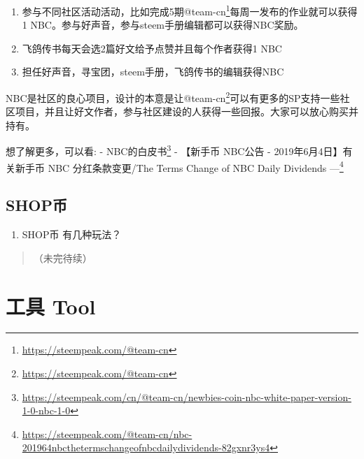 \documentclass[]{ctexbook}
\providecommand{\tightlist}{%
  \setlength{\itemsep}{0pt}\setlength{\parskip}{0pt}}
\renewcommand{\href}[2]{#2\footnote{\url{#1}}}
\begin{document}
\begin{enumerate}
\def\labelenumi{\arabic{enumi}.}
\tightlist
\item
  参与不同社区活动活动，比如完成5期\href{https://steempeak.com/@team-cn}{@team-cn}每周一发布的作业就可以获得1 NBC。参与好声音，参与steem手册编辑都可以获得NBC奖励。
\item
  飞鸽传书每天会选2篇好文给予点赞并且每个作者获得1 NBC
\item
  担任好声音，寻宝团，steem手册，飞鸽传书的编辑获得NBC
\end{enumerate}

NBC是社区的良心项目，设计的本意是让\href{https://steempeak.com/@team-cn}{@team-cn}可以有更多的SP支持一些社区项目，并且让好文作者，参与社区建设的人获得一些回报。大家可以放心购买并持有。

想了解更多，可以看:
- \href{https://steempeak.com/cn/@team-cn/newbies-coin-nbc-white-paper-version-1-0-nbc-1-0}{NBC的白皮书}
- \href{https://steempeak.com/@team-cn/nbc-201964nbcthetermschangeofnbcdailydividends-82gxnr3ys4}{【新手币 NBC公告 - 2019年6月4日】有关新手币 NBC 分红条款变更/The Terms Change of NBC Daily Dividends ---}

\hypertarget{shop}{%
\section{SHOP币}\label{shop}}

\begin{enumerate}
\def\labelenumi{\arabic{enumi}.}
\tightlist
\item
  SHOP币 有几种玩法？
\end{enumerate}

\begin{quote}
（未完待续）
\end{quote}

\hypertarget{tool}{%
\chapter{工具 Tool}\label{tool}}
\end{document}
